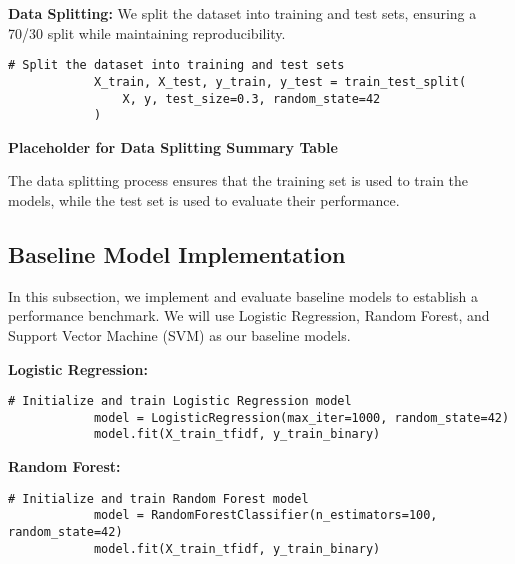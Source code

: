         \textbf{Data Splitting:} We split the dataset into training and test sets, ensuring a 70/30 split while maintaining reproducibility.
        
        \vspace{0.5em}

        \begin{lstlisting}[caption={Split the dataset into training and test sets}, label={lst:split_dataset}]
            # Split the dataset into training and test sets
            X_train, X_test, y_train, y_test = train_test_split(
                X, y, test_size=0.3, random_state=42
            )
        \end{lstlisting}

        \textbf{Placeholder for Data Splitting Summary Table}

        The data splitting process ensures that the training set is used to train the models, while the test set is used to evaluate their performance.
            
    \subsection{Baseline Model Implementation}
    
        In this subsection, we implement and evaluate baseline models to establish a performance benchmark. We will use Logistic Regression, Random Forest, and Support Vector Machine (SVM) as our baseline models.

        \textbf{Logistic Regression:}
        
        \vspace{0.5em}

        \begin{lstlisting}[caption={Train Logistic Regression model}, label={lst:logistic_regression}]
            # Initialize and train Logistic Regression model
            model = LogisticRegression(max_iter=1000, random_state=42)
            model.fit(X_train_tfidf, y_train_binary)
        \end{lstlisting}

        \textbf{Random Forest:}

        \vspace{0.5em}

        \begin{lstlisting}[caption={Train Random Forest model}, label={lst:random_forest}]
            # Initialize and train Random Forest model
            model = RandomForestClassifier(n_estimators=100, random_state=42)
            model.fit(X_train_tfidf, y_train_binary)
        \end{lstlisting}

